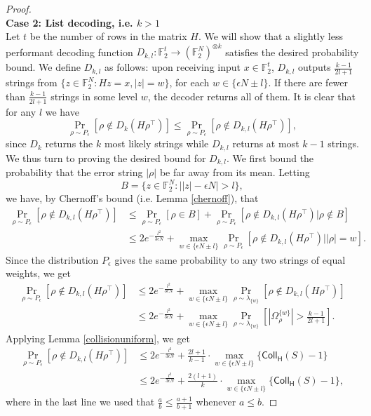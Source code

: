 \documentclass[12pt]{article}
\begin{document}
\begin{proof}
\hfil\\
\textbf{Case 2: List decoding, i.e. $k>1$} 
\hfil\\
Let $t$ be the number of rows in the matrix $H$. We will show that a slightly less performant decoding function $D_{k,l}:\mathbb{F}_2^t\rightarrow (\mathbb{F}_2^N)^{\otimes k}$ satisfies the desired probability bound. We define $D_{k,l}$ as follows: upon receiving input $x\in\mathbb{F}_2^t$, $D_{k,l}$ outputs $\frac{k-1}{2l+1}$ strings from $\{z\in\mathbb{F}_2^N:Hz=x, |z|=w\}$, for each $w\in\{\epsilon N\pm l\}$. If there are fewer than $\frac{k-1}{2l+1}$ strings in some level $w$, the decoder returns all of them. It is clear that for any $l$ we have
$$\Pr_{\rho\sim P_\epsilon}[ \rho\notin D_{k}(H\rho^\intercal)]\leq \Pr_{\rho\sim P_\epsilon}[ \rho\notin D_{k,l}(H\rho^\intercal)],$$
since $D_k$ returns the $k$ most likely strings while $D_{k,l}$ returns at most $k-1$ strings. We thus turn to proving the desired bound for $D_{k,l}$. We first bound the probability that the error string $|\rho|$ be far away from its mean. Letting  
$$B=\Big\{z\in\mathbb{F}_2^N:\big||z|-\epsilon N\big|>l\Big\},$$
we have, by Chernoff's bound (i.e. Lemma \ref{chernoff}), that
\begin{align*}
    \Pr_{\rho\sim P_\epsilon}[ \rho\notin D_{k,l}(H\rho^\intercal)]&\leq \Pr_{\rho\sim P_\epsilon}[\rho\in B]+\Pr_{\rho\sim P_\epsilon}[ \rho\notin D_{k,l}(H\rho^\intercal)\big|\rho\notin B]\\
    &\leq 2e^{-\frac{l^2}{3\epsilon N}}+\max_{w\in\{\epsilon N\pm l\}}\Pr_{\rho\sim P_\epsilon}[ \rho\notin D_{k,l}(H\rho^\intercal)\big||\rho|=w].
\end{align*}
Since the distribution $P_\epsilon$ gives the same probability to any two strings of equal weights, we get 
\begin{align*}
    \Pr_{\rho\sim P_\epsilon}[ \rho\notin D_{k,l}(H\rho^\intercal)] &\leq 2e^{-\frac{l^2}{3\epsilon N}}+\max_{w\in\{\epsilon N\pm l\}}\Pr_{\rho\sim \lambda_{\{w\}}}[ \rho\notin D_{k,l}(H\rho^\intercal)]\\
    &\leq 2e^{-\frac{l^2}{3\epsilon N}}+\max_{w\in\{\epsilon N\pm l\}}\Pr_{\rho\sim \lambda_{\{w\}}}[|\Omega_\rho^{\{w\}}|>\frac{k-1}{2l+1}]. 
\end{align*}
Applying Lemma \ref{collisionuniform}, we get
\begin{align*}
    \Pr_{\rho\sim P_\epsilon}[ \rho\notin D_{k,l}(H\rho^\intercal)] &\leq 2e^{-\frac{l^2}{3\epsilon N}}+\frac{2l+1}{k-1}\cdot \max_{w\in\{\epsilon N\pm l\}} \Big\{ \mathsf{Coll_H}(S)-1 \Big\}\\
    &\leq 2e^{-\frac{l^2}{3\epsilon N}}+\frac{2(l+1)}{k}\cdot \max_{w\in\{\epsilon N\pm l\}} \Big\{ \mathsf{Coll_H}(S)-1 \Big\},
\end{align*}
where in the last line we used that $\frac{a}{b}\leq\frac{a+1}{b+1}$ whenever $a\leq b$.
\end{proof}
\end{document}
